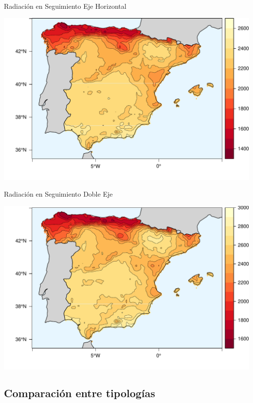 \documentclass[xcolor={usenames,svgnames,dvipsnames}]{beamer}
\begin{document}
\begin{frame}[label={sec:org7c2a8c0}]{Radiación en Seguimiento Eje Horizontal}
\begin{center}
\includegraphics[width=.9\linewidth]{../figs/HorizKrig.pdf}
\end{center}
\end{frame}



\begin{frame}[label={sec:orga8c61c5}]{Radiación en Seguimiento Doble Eje}
\begin{center}
\includegraphics[width=.9\linewidth]{../figs/TwoKrig.pdf}
\end{center}
\end{frame}

\subsection{Comparación entre tipologías}
\label{sec:orgc7ce942}
\end{document}
